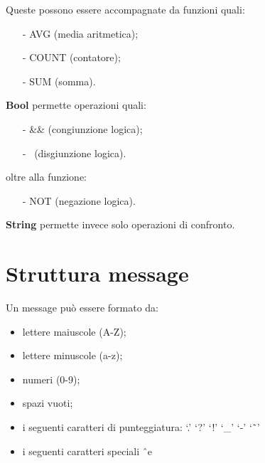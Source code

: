 \begin{center}
Queste possono essere accompagnate da funzioni quali:
\begin{itemize}
\item[-] AVG (media aritmetica);
\item[-] COUNT (contatore);
\item[-] SUM (somma). 
\end{itemize}
\textbf{Bool} permette operazioni quali:
\begin{itemize}
\item[-] \&\& (congiunzione logica);
\item[-] \textbar\textbar\ (disgiunzione logica).
\end{itemize}
oltre alla funzione:
\begin{itemize}
\item[-] NOT (negazione logica). 
\end{itemize}
\textbf{String} permette invece solo operazioni di confronto.
\section{Struttura message}
Un message pu\`o essere formato da:
\begin{itemize}
\item lettere maiuscole (A-Z);
\item lettere minuscole (a-z);
\item numeri (0-9);
\item spazi vuoti;
\item i seguenti caratteri di punteggiatura: `.'  `?'  `!'  `\_'  `-'  `\~\ '
\item i seguenti caratteri speciali \^\ e \~ \\
\end{itemize}

\end{center}

